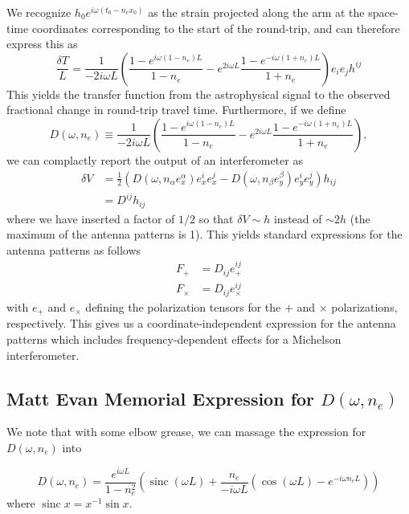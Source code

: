 \documentclass{article}
\DeclareMathOperator{\sinc}{sinc}
\begin{document}
We recognize $h_0 e^{i\omega(t_0-n_ex_0)}$ as the strain projected along the arm at the space-time coordinates corresponding to the start of the round-trip, and can therefore express this as
\begin{equation}
    \frac{\delta T}{L} = \frac{1}{-2i\omega L} \left(\frac{1-e^{i\omega(1-n_e)L}}{1-n_e} - e^{2i\omega L}\frac{1-e^{-i\omega(1+n_e)L}}{1+n_e} \right) e_i e_j h^{ij}
\end{equation}
This yields the transfer function from the astrophysical signal to the observed fractional change in round-trip travel time. 
Furthermore, if we define
\begin{equation}
    D(\omega, n_e) \equiv \frac{1}{-2i\omega L} \left(\frac{1-e^{i\omega(1-n_e)L}}{1-n_e} - e^{2i\omega L}\frac{1-e^{-i\omega(1+n_e)L}}{1+n_e} \right),
\end{equation}
we can complactly report the output of an interferometer as
\begin{align}
    \delta V & = \frac{1}{2}\left( D(\omega, n_\alpha e_x^\alpha) e_x^i e_x^j - D(\omega, n_\beta e_y^\beta) e_y^i e_y^j \right) h_{ij} \\
             & = D^{ij} h_{ij}
\end{align}
where we have inserted a factor of $1/2$ so that $\delta V\sim h$ instead of $\sim 2h$ (the maximum of the antenna patterns is 1).
This yields standard expressions for the antenna patterns as follows
\begin{align}
    F_+ & = D_{ij} e_+^{ij} \\
    F_\times & = D_{ij} e_\times^{ij}
\end{align}
with $e_+$ and $e_\times$ defining the polarization tensors for the $+$ and $\times$ polarizations, respectively.
This gives us a coordinate-independent expression for the antenna patterns which includes frequency-dependent effects for a Michelson interferometer.

\subsection*{Matt Evan Memorial Expression for $D(\omega, n_e)$}

We note that with some elbow grease, we can massage the expression for $D(\omega, n_e)$ into

\begin{equation}
    D(\omega, n_e) = \frac{e^{i\omega L}}{1-n_e^2}\left( \sinc(\omega L) + \frac{n_e}{-i\omega L} \left( \cos(\omega L) - e^{-i\omega n_e L}\right)\right)
\end{equation}
where $\sinc x = x^{-1} \sin x$.
\end{document}
